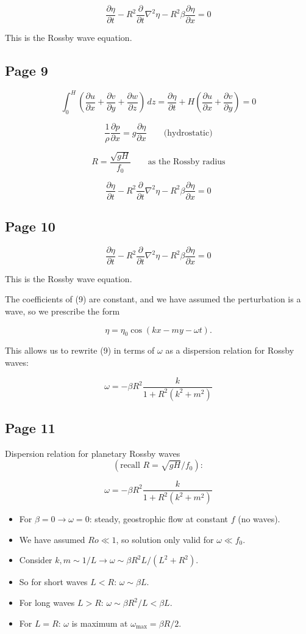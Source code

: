 \documentclass[11pt]{article}
\begin{document}
\[
\frac{\partial \eta}{\partial t}
-
R^2\frac{\partial}{\partial t}\nabla^2\eta
-
R^2\beta\frac{\partial \eta}{\partial x}
=
0
\tag{9}
\]

This is the Rossby wave equation.

\subsection*{Page 9}
\[
\int_0^H
\left(
\frac{\partial u}{\partial x}
+\frac{\partial v}{\partial y}
+\frac{\partial w}{\partial z}
\right)\,dz
=
\frac{\partial \eta}{\partial t}
+
H\left(
\frac{\partial u}{\partial x}
+\frac{\partial v}{\partial y}
\right)
=
0
\]

\[
\frac{1}{\rho}\frac{\partial p}{\partial x}
=
g\frac{\partial \eta}{\partial x}
\qquad
\text{(hydrostatic)}
\]

\[
R=\frac{\sqrt{gH}}{f_0}
\qquad
\text{as the Rossby radius}
\]

\[
\frac{\partial \eta}{\partial t}
-
R^2\frac{\partial}{\partial t}\nabla^2\eta
-
R^2\beta\frac{\partial \eta}{\partial x}
=
0
\]

\subsection*{Page 10}
\[
\frac{\partial \eta}{\partial t}
-
R^2\frac{\partial}{\partial t}\nabla^2\eta
-
R^2\beta\frac{\partial \eta}{\partial x}
=
0
\tag{9}
\]

This is the Rossby wave equation.

The coefficients of (9) are constant, and we have assumed the perturbation
is a wave, so we prescribe the form

\[
\eta=\eta_0\cos(kx-my-\omega t).
\]

This allows us to rewrite (9) in terms of $\omega$ as a dispersion relation
for Rossby waves:

\[
\omega
=
-\beta R^2
\frac{k}{1+R^2(k^2+m^2)}
\]

\subsection*{Page 11}
Dispersion relation for planetary Rossby waves
\[
\left(
\text{recall } R=\sqrt{gH}/f_0
\right):
\]

\[
\omega
=
-\beta R^2
\frac{k}{1+R^2(k^2+m^2)}
\]

\begin{itemize}
\item For $\beta=0 \to \omega=0$: steady, geostrophic flow at constant $f$
(no waves).
\item We have assumed $Ro \ll 1$, so solution only valid for $\omega \ll f_0$.
\item Consider $k,m \sim 1/L \to \omega \sim \beta R^2 L/(L^2+R^2)$.
\item So for short waves $L<R$: $\omega \sim \beta L$.
\item For long waves $L>R$: $\omega \sim \beta R^2/L < \beta L$.
\item For $L=R$: $\omega$ is maximum at $\omega_{\max}=\beta R/2$.
\end{itemize}
\end{document}
